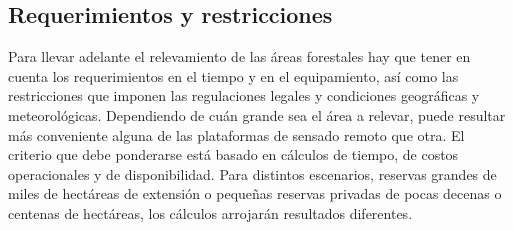 \subsection{Requerimientos y restricciones}
Para llevar adelante el relevamiento de las áreas forestales hay que tener en cuenta los requerimientos en el tiempo y en el equipamiento, así como las restricciones que imponen las regulaciones legales y condiciones geográficas y meteorológicas. Dependiendo de cuán grande sea el área a relevar, puede resultar más conveniente alguna de las plataformas de sensado remoto que otra. El criterio que debe ponderarse está basado en cálculos de tiempo, de costos operacionales y de disponibilidad. Para distintos escenarios, reservas grandes de miles de hectáreas de extensión o pequeñas reservas privadas de pocas decenas o centenas de hectáreas, los cálculos arrojarán resultados diferentes.
